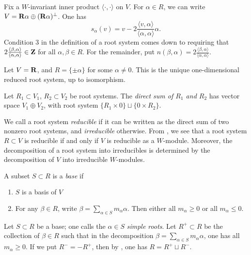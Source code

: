 Fix a $W$-invariant inner product $\langle\cdot,\cdot\rangle$ on $V$. For 
$\alpha\in R$, we can write $V=\mathbf{R}\alpha\oplus (\mathbf{R}\alpha)^\bot$. One has 
\[
  s_\alpha(v) = v-2\frac{\langle v,\alpha\rangle}{\langle \alpha,\alpha\rangle} \alpha .
\]
Condition 3 in the definition of a root system comes down to requiring that 
$2\frac{\langle \beta,\alpha\rangle}{\langle \alpha,\alpha\rangle}\in \mathbf{Z}$ for 
all $\alpha,\beta\in R$. For the remainder, put 
$n(\beta,\alpha) = 2\frac{\langle \beta,\alpha\rangle}{\langle \alpha,\alpha\rangle}$. 

\begin{example}
Let $V=\mathbf{R}$, and $R=\{\pm \alpha\}$ for some $\alpha\ne 0$. This is the unique 
one-dimensional reduced root system, up to isomorphism. 
\end{example}

\begin{definition}
Let $R_1\subset V_1$, $R_2\subset V_2$ be root systems. The \emph{direct sum 
of $R_1$ and $R_2$} has vector space $V_1\oplus V_2$, with root system 
$\{R_1\times 0\}\sqcup \{0\times R_2\}$. 
\end{definition}

We call a root system \emph{reducible} if it can be written as the direct sum 
of two nonzero root systems, and \emph{irreducible} otherwise. From 
\cite[VI \S 1.2 prop.5]{bourbaki-lie-alg-4-6}, we see that a root system 
$R\subset V$ is reducible if and only if $V$ is reducible as a $W$-module. 
Moreover, the decomposition of a root system into irreducibles is determined by 
the decomposition of $V$ into irreducible $W$-modules. 

\begin{definition}
A subset $S\subset R$ is a \emph{base} if 
\begin{enumerate}
  \item $S$ is a basis of $V$
  \item For any $\beta\in R$, write $\beta=\sum_{\alpha\in S} m_\alpha \alpha$. 
    Then either all $m_\alpha\geqslant 0$ or all $m_\alpha\leqslant 0$. 
\end{enumerate}
\end{definition}

Let $S\subset R$ be a base; one calls the $\alpha\in S$ \emph{simple roots}. 
Let $R^+\subset R$ be the collection of $\beta\in R$ such that in the 
decomposition $\beta=\sum_{\alpha\in S} m_\alpha \alpha$, one has all 
$m_\alpha\geqslant 0$. If we put $R^-=-R^+$, then by 
\cite[VI \S 1.6 th.3]{bourbaki-lie-alg-4-6}, one has 
$R=R^+\sqcup R^-$. 

